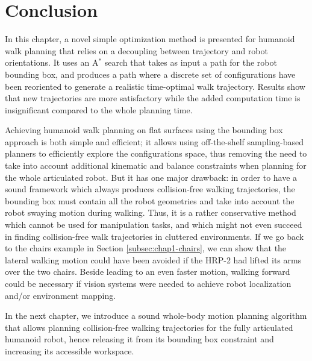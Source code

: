 \section{Conclusion}
In this chapter, a novel simple optimization method is
presented for humanoid walk planning that relies on a decoupling
between trajectory and robot orientations. It uses an A$^{*}$ search that
takes as input a path for the robot bounding box, and produces a path
where a discrete set of configurations have been reoriented to generate
a realistic time-optimal walk trajectory. Results show that new
trajectories are more satisfactory while the added computation time is
insignificant compared to the whole planning time.

Achieving humanoid walk planning on flat surfaces using the bounding
box approach is both simple and efficient; it allows using
off-the-shelf sampling-based planners to efficiently explore the
configurations space, thus removing the need to take into account
additional kinematic and balance constraints when planning for the
whole articulated robot. But it has one major drawback: in order to
have a sound framework which always produces collision-free walking
trajectories, the bounding box must contain all the robot geometries
and take into account the robot swaying motion during walking. Thus,
it is a rather conservative method which cannot be used for
manipulation tasks, and which might not even succeed in finding
collision-free walk trajectories in cluttered environments. If we go
back to the chairs example in Section \ref{subsec:chap1-chairs}, we
can show that the lateral walking motion could have been avoided if
the HRP-2 had lifted its arms over the two chairs. Beside leading to
an even faster motion, walking forward could be necessary if vision
systems were needed to achieve robot localization and/or environment
mapping.

In the next chapter, we introduce a sound whole-body motion planning
algorithm that allows planning collision-free walking trajectories for
the fully articulated humanoid robot, hence releasing it from its
bounding box constraint and increasing its accessible workspace.
